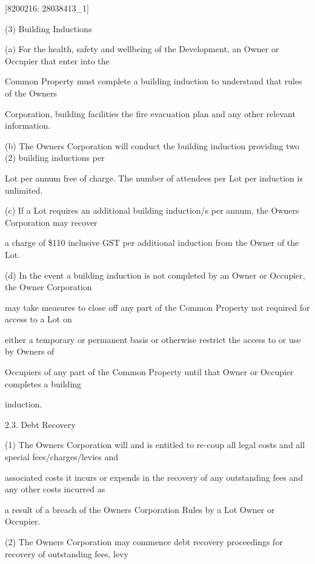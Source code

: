 \documentclass{article}
\begin{document}
{\fontsize{7.02}{1}[8200216: 28038413\_1] }

{\fontsize{9.962}{1}(3) Building Inductions }

{\fontsize{9.962}{1}(a) For the health, safety and wellbeing of the Development, an Owner or Occupier that enter into the }

{\fontsize{10.02}{1}Common Property must complete a building induction to understand that rules of the Owners }

{\fontsize{10.02}{1}Corporation, building facilities the fire evacuation plan and any other relevant information. }

{\fontsize{9.962}{1}(b) The Owners Corporation will conduct the building induction providing two (2) building inductions per }

{\fontsize{10.02}{1}Lot per annum free of charge. The number of attendees per Lot per induction is unlimited. }

{\fontsize{9.962}{1}(c) If a Lot requires an additional building induction/s per annum, the Owners Corporation may recover }

{\fontsize{10.02}{1}a charge of \$110 inclusive GST per additional induction from the Owner of the Lot. }

{\fontsize{9.962}{1}(d) In the event a building induction is not completed by an Owner or Occupier, the Owner Corporation }

{\fontsize{10.02}{1}may take measures to close off any part of the Common Property not required for access to a Lot on }

{\fontsize{10.02}{1}either a temporary or permanent basis or otherwise restrict the access to or use by Owners of }

{\fontsize{10.02}{1}Occupiers of any part of the Common Property until that Owner or Occupier completes a building }

{\fontsize{10.02}{1}induction. }

{\fontsize{9.99}{1}2.3. Debt Recovery }

{\fontsize{9.962}{1}(1) The Owners Corporation will and is entitled to re-coup all legal costs and all special fees/charges/levies and }

{\fontsize{10.02}{1}associated costs it incurs or expends in the recovery of any outstanding fees and any other costs incurred as }

{\fontsize{10.02}{1}a result of a breach of the Owners Corporation Rules by a Lot Owner or Occupier. }

{\fontsize{9.962}{1}(2) The Owners Corporation may commence debt recovery proceedings for recovery of outstanding fees, levy }
\end{document}
